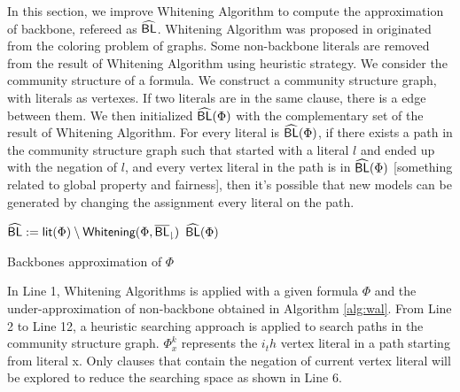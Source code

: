 In this section, we improve Whitening Algorithm to compute the approximation of backbone, refereed as ${\sf \widehat{BL}}$. Whitening Algorithm was proposed in \cite{CJG2001} originated from the coloring problem of graphs. Some non-backbone literals are removed from the result of Whitening Algorithm using heuristic strategy. We consider the community structure of a formula. We construct a community structure graph, with literals as vertexes. If two literals are in the same clause, there is a edge between them. We then initialized ${\sf \widehat{BL}}(\Phi)$ with the complementary set of the result of Whitening Algorithm. For every literal is ${\sf \widehat{BL}}(\Phi)$, if there exists a path in the community structure graph such that started with a literal $l$ and ended up with the negation of $l$, and every vertex literal in the path is in ${\sf \widehat{BL}}(\Phi)$ [something related to global property and fairness], then it's possible that new models can be generated by changing the assignment every literal on the path.

\begin{algorithm}
\SetAlgoShortEnd
\SetFillComment
{}


${\sf \widehat{BL}}:=\textsf{lit}(\Phi)\setminus{\textsf{Whitening}}(\Phi,{\sf \overline{BL}_\downharpoonright})$\;
\Return ${\sf \widehat{BL}}(\Phi)$\;
\caption{Backbones approximation of $\Phi$}
\label{alg:nBLo}
\end{algorithm}

In Line 1, Whitening Algorithms is applied with a given formula $\Phi$ and the under-approximation of non-backbone obtained in Algorithm \ref{alg:wal}. From Line 2 to Line 12, a heuristic searching approach is applied to search paths in the community structure graph. $\Phi^k_x$ represents the $i_th$ vertex literal in a path starting from literal x. Only clauses that contain the negation of current vertex literal will be explored to reduce the searching space as shown in Line 6.

